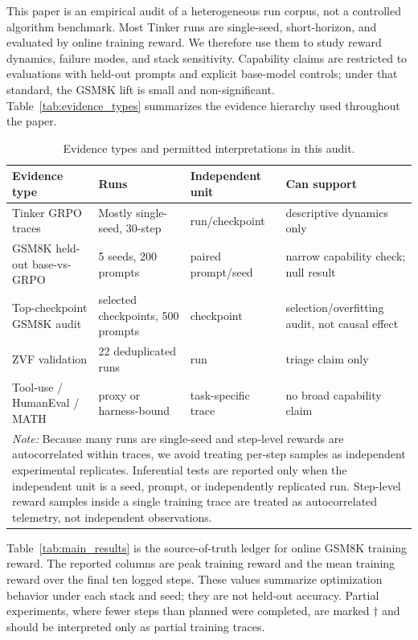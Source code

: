 This paper is an empirical audit of a heterogeneous run corpus, not a controlled
algorithm benchmark. Most Tinker runs are single-seed, short-horizon, and
evaluated by online training reward. We therefore use them to study reward
dynamics, failure modes, and stack sensitivity. Capability claims are restricted
to evaluations with held-out prompts and explicit base-model controls; under that
standard, the GSM8K lift is small and non-significant. Table~\ref{tab:evidence_types}
summarizes the evidence hierarchy used throughout the paper.

\begin{table}[htbp]
\centering
\caption{Evidence types and permitted interpretations in this audit.}
\label{tab:evidence_types_detail}
\scriptsize
\begin{tabular}{p{3.2cm}p{3.0cm}p{2.5cm}p{2.5cm}}
\toprule
\textbf{Evidence type} & \textbf{Runs} & \textbf{Independent unit} & \textbf{Can support} \\
\midrule
Tinker GRPO traces & Mostly single-seed, 30-step & run/checkpoint & descriptive dynamics only \\
GSM8K held-out base-vs-GRPO & 5 seeds, 200 prompts & paired prompt/seed & narrow capability check; null result \\
Top-checkpoint GSM8K audit & selected checkpoints, 500 prompts & checkpoint & selection/overfitting audit, not causal effect \\
ZVF validation & 22 deduplicated runs & run & triage claim only \\
Tool-use / HumanEval / MATH & proxy or harness-bound & task-specific trace & no broad capability claim \\
\midrule
\multicolumn{4}{p{11.2cm}}{\small \textit{Note:} Because many runs are single-seed and step-level rewards are autocorrelated within traces, we avoid treating per-step samples as independent experimental replicates. Inferential tests are reported only when the independent unit is a seed, prompt, or independently replicated run. Step-level reward samples inside a single training trace are treated as autocorrelated telemetry, not independent observations.} \\
\bottomrule
\end{tabular}
\end{table}

Table~\ref{tab:main_results} is the source-of-truth ledger for online GSM8K
training reward.  The reported columns are peak training reward and the mean
training reward over the final ten logged steps.  These values summarize
optimization behavior under each stack and seed; they are not held-out accuracy.
Partial experiments, where fewer steps than planned were completed, are marked
$\dagger$ and should be interpreted only as partial training traces.

